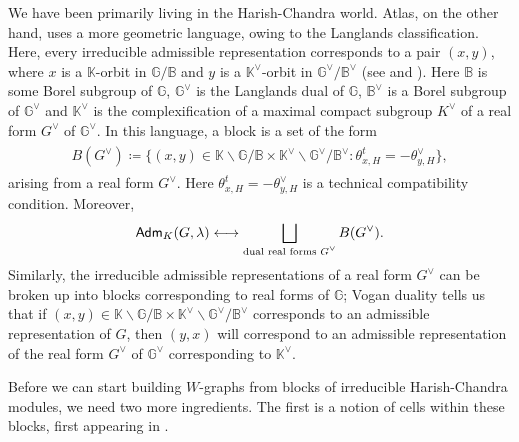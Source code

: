 \noindent\begin{remark} We have been primarily living in the Harish-Chandra world. Atlas, on the other hand, uses a more geometric language, owing to the Langlands classification. Here, every irreducible admissible representation corresponds to a pair $(x, y)$, where $x$ is a $\mathbb{K}$-orbit in $\mathbb{G}/\mathbb{B}$ and $y$ is a $\mathbb{K}^\vee$-orbit in $\mathbb{G}^\vee/\mathbb{B}^\vee$ (see \cite[\S 10]{AC09} and \cite[\S 8]{Ada08}). Here $\mathbb{B}$ is some Borel subgroup of $\mathbb{G}$, $\mathbb{G}^\vee$ is the Langlands dual of $\mathbb{G}$, $\mathbb{B}^\vee$ is a Borel subgroup of $\mathbb{G}^\vee$ and $\mathbb{K}^\vee$ is the complexification of a maximal compact subgroup $K^\vee$ of a real form $G^\vee$ of $\mathbb{G}^\vee$. In this language, a block is a set of the form
\begin{align*}
\begin{split}
B(G^\vee) \coloneqq \{(x, y) \in \mathbb{K}\backslash\mathbb{G}/\mathbb{B} \times \mathbb{K}^\vee\backslash\mathbb{G}^\vee/\mathbb{B}^\vee : \theta_{x,H}^t = -\theta_{y,H}^\vee\},
\end{split}
\end{align*}
\noindent arising from a real form $G^\vee$. Here $\theta_{x,H}^t = -\theta_{y,H}^\vee$ is a technical compatibility condition. Moreover,
\begin{align*}
\begin{split}
\textup{\textsf{Adm}}_K(G, \lambda) \longleftrightarrow \bigsqcup_\textup{dual real forms $G^\vee$} B(G^\vee).
\end{split}
\end{align*}
\noindent Similarly, the irreducible admissible representations of a real form $G^\vee$ can be broken up into blocks corresponding to real forms of $\mathbb{G}$; Vogan duality tells us that if $(x, y) \in \mathbb{K}\backslash\mathbb{G}/\mathbb{B} \times \mathbb{K}^\vee\backslash\mathbb{G}^\vee/\mathbb{B}^\vee$ corresponds to an admissible representation of $G$, then $(y, x)$ will correspond to an admissible representation of the real form $G^\vee$ of $\mathbb{G}^\vee$ corresponding to $\mathbb{K}^\vee$.\\
\end{remark}

\noindent Before we can start building $W$-graphs from blocks of irreducible Harish-Chandra modules, we need two more ingredients. The first is a notion of cells within these blocks, first appearing in \cite{BV83}.\\

